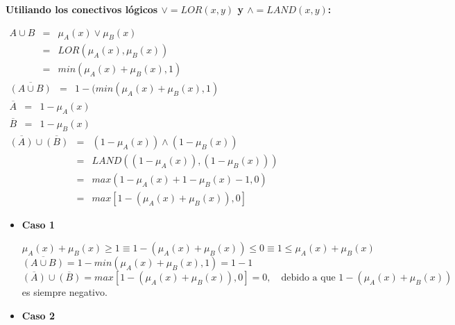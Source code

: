 \documentclass[letterpaper,spanish,11pt]{article}
\begin{document}
\begin{enumerate}
\textbf{Utiliando los conectivos l\'{o}gicos $\vee= LOR(x,y)$ y $\wedge=LAND(x,y)$:}

$\begin{array} {lll} A \cup B & = & \mu_{A}(x) \vee \mu_{B}(x) \\ 
& = & LOR(\mu_{A}(x), \mu_{B}(x)) \\ & = &min(\mu_{A}(x) + \mu_{B}(x), 1)\end{array}$\\

$\begin{array} {lll} \overline{(A \cup B)} & = & 1 - ( min(\mu_{A}(x) + \mu_{B}(x) ,1  ) \end{array}$\\

$\begin{array} {lll} \overline{A} & = & 1 - \mu_{A}(x)  \end{array}$\\

$\begin{array} {lll} \overline{B} & = & 1 - \mu_{B}(x)  \end{array}$\\


$\begin{array} {lll} \overline{(A)} \cup \overline{(B)} & = & (1 - \mu_{A}(x)) \wedge (1-\mu_{B}(x))  \\ &= &LAND((1 - \mu_{A}(x)) ,(1-\mu_{B}(x)) ) \\ 
&= & max(1 - \mu_{A}(x) + 1 - \mu_{B}(x) -1, 0) \\ 
&= & max[1 - (\mu_{A}(x) + \mu_{B}(x)) , 0] \end{array}$\\

\begin{itemize}
\item \textbf{Caso 1}

$\mu_{A}(x) + \mu_{B}(x) \geq 1 \equiv 1 - (\mu_{A}(x) + \mu_{B}(x)) \leq 0 \equiv 1 \leq \mu_{A}(x) + \mu_{B}(x)$\\

$\overline{(A \cup B)} = 1-min(\mu_{A}(x) + \mu_{B}(x), 1) = 1 -1$\\

$\overline{(A)} \cup \overline{(B)}= max[1 - (\mu_{A}(x) + \mu_{B}(x)) , 0]  =0, \ \ \ \text{ debido a que } 1 - (\mu_{A}(x) + \mu_{B}(x))$ es siempre negativo.




\item \textbf{Caso 2}


\end{itemize}
\end{enumerate}
\end{document}
